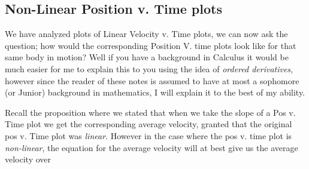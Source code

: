 \documentclass[12pt]{article}
\theoremstyle{break}
\begin{document}
\subsection{Non-Linear Position v. Time plots}
We have analyzed plots of Linear Velocity v. Time plots, we can now ask the question; how would the corresponding Position V. time plots look like for that same body in motion? Well if you have a background in Calculus it would be much easier for me to explain this to you using the idea of \emph{ordered derivatives}, however since the reader of these notes is assumed to have at most a sophomore (or Junior) background in mathematics, I will explain it to the best of my ability.

Recall the proposition where we stated that when we take the slope of a Pos v. Time plot we get the corresponding average velocity, granted that the original pos v. Time plot was \emph{linear}. However in the case where the pos v. time plot is \emph{non-linear}, the equation for the average velocity will at best give us the average velocity over 


	
\end{document}
